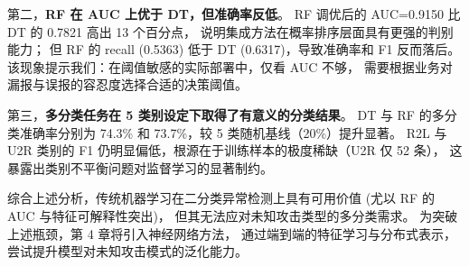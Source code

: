 第二，\textbf{RF 在 AUC 上优于 DT，但准确率反低}。
RF 调优后的 AUC=0.9150 比 DT 的 0.7821 高出 13 个百分点，
说明集成方法在概率排序层面具有更强的判别能力；
但 RF 的 recall (0.5363) 低于 DT (0.6317)，导致准确率和 F1 反而落后。
该现象提示我们：在阈值敏感的实际部署中，仅看 AUC 不够，
需要根据业务对漏报与误报的容忍度选择合适的决策阈值。

第三，\textbf{多分类任务在 5 类别设定下取得了有意义的分类结果}。
DT 与 RF 的多分类准确率分别为 74.3\% 和 73.7\%，较 5 类随机基线（20\%）提升显著。
R2L 与 U2R 类别的 F1 仍明显偏低，根源在于训练样本的极度稀缺（U2R 仅 52 条），
这暴露出类别不平衡问题对监督学习的显著制约。

综合上述分析，传统机器学习在二分类异常检测上具有可用价值
(尤以 RF 的 AUC 与特征可解释性突出)，
但其无法应对未知攻击类型的多分类需求。
为突破上述瓶颈，第 4 章将引入神经网络方法，
通过端到端的特征学习与分布式表示，
尝试提升模型对未知攻击模式的泛化能力。
